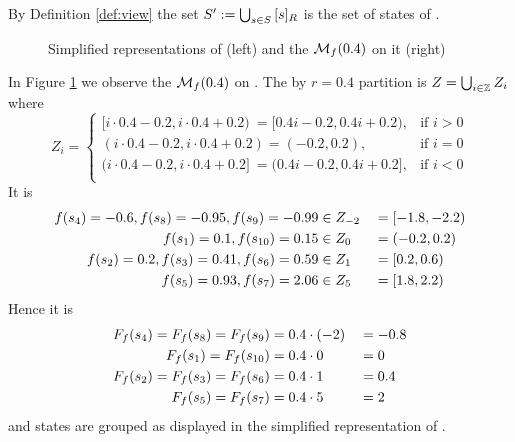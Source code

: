 \documentclass[preview]{standalone}
\begin{document}
\noindent By Definition \ref{def:view} the set ${S}' := \bigcup_{{s} \in {S}} {{[{s}]_{{R}}}}$ is the set of states of \viewprop.

\begin{figure}[!htb]
	\begin{minipage}{.6\textwidth}
		
	\end{minipage}%
	\begin{minipage}{.5\textwidth}
		
	\end{minipage}
	\caption{Simplified representations of \mdp (left) and the \viewN ${{{{{\mathcal{M}}}}_{{f}}}}(0.4)$ on it (right)}
	\label{fig:PropBeforeAfter} 
\end{figure}

\begin{exmp}
	In Figure \ref{fig:PropBeforeAfter} we observe the \viewN ${{{{{\mathcal{M}}}}_{{f}}}}(0.4)$ on \chgph. The by $r=0.4$ partition is $Z = \bigcup_{i \in {\mathbb{Z}}} Z_i$ where
\[
Z_i = 
\begin{cases}
	[i \cdot 0.4 - 0.2, i \cdot 0.4 + 0.2) \:\!= [0.4i - 0.2, 0.4i + 0.2) , &\text{if } i > 0 \\
	(i \cdot 0.4 - 0.2, i \cdot 0.4 + 0.2) = (-0.2, 0.2), &\text{if } i = 0 \\
	(i \cdot 0.4 - 0.2, i \cdot 0.4 + 0.2] \:\!= (0.4i - 0.2, 0.4i + 0.2], &\text{if } i < 0 \\
\end{cases}
\]
It is 
\begin{alignat*}{3}
	{f}({s}_4)=-0.6, {f}({s}_8)=-0.95, {f}({s}_9) = -0.99 &\in Z_{-2} &&= [-1.8, -2.2) \\
	{f}({s}_1)=0.1, {f}({s}_{10})=0.15 &\in Z_0 &&= (-0.2, 0.2)\\
	{f}({s}_2)=0.2, {f}({s}_3)=0.41, {f}({s}_6) = 0.59 &\in Z_1 &&= [0.2, 0.6) \\
	{f}({s}_5)=0.93, {f}({s}_{7})=2.06 &\in Z_5 &&= [1.8, 2.2) \\
\end{alignat*}
Hence it is
\begin{alignat*}{3}
 	{\ensuremath{{F_{{f}}}}}({s}_4) = {{F_{{f}}}}({s}_{8}) = {{F_{{f}}}}({s}_{9}) &= 0.4\cdot(-2) &&= -0.8 \\
 	{{F_{{f}}}}({s}_1) = {{F_{{f}}}}({s}_{10}) &= 0.4\cdot0 &&= 0 \\
 	{{F_{{f}}}}({s}_2) = {{F_{{f}}}}({s}_{3}) = {{F_{{f}}}}({s}_{6}) &= 0.4\cdot1 &&= 0.4 \\
 	{{F_{{f}}}}({s}_5) = {{F_{{f}}}}({s}_{7}) &= 0.4\cdot5 &&= 2 \\
\end{alignat*}
and states are grouped as displayed in the simplified representation of \viewprop.
\end{exmp}
\end{document}

